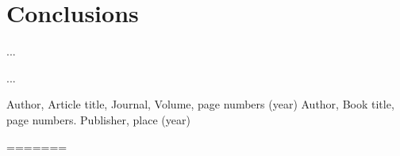 \section{Conclusions}
\label{conc}

...



\begin{acknowledgements}
...
\end{acknowledgements}




\begin{thebibliography}{}
%
%
Author, Article title, Journal, Volume, page numbers (year)
Author, Book title, page numbers. Publisher, place (year)
\end{thebibliography}



=======
%
%
%
%
%
%
\RequirePackage{fix-cm}
%
\documentclass[twocolumn,epjc3]{svjour3}  
%
\smartqed  %
%
\RequirePackage{graphicx}
%
%
\RequirePackage{latexsym}
%
%
%



